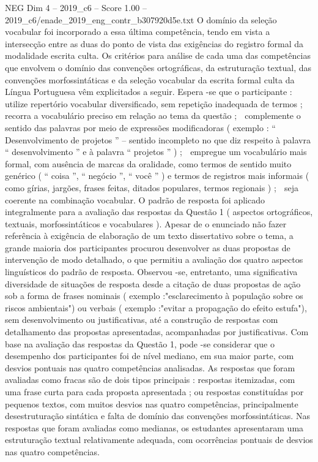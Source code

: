 \begin{textsample}{NEG Dim 4 – 2019\_c6 – Score 1.00 – 2019\_c6/enade\_2019\_eng\_contr\_b307920d5e.txt}
O domínio da seleção vocabular foi incorporado a essa última competência, tendo em vista a intersecção entre as duas do ponto de vista das exigências do registro formal da modalidade escrita culta.
Os critérios para análise de cada uma das competências que envolvem o domínio das convenções ortográficas, da estruturação textual, das convenções morfossintáticas e da seleção vocabular da escrita formal culta da Língua Portuguesa vêm explicitados a seguir.
Espera -se que o participante :  utilize repertório vocabular diversificado, sem repetição inadequada de termos ;  recorra a vocabulário preciso em relação ao tema da questão ;  complemente o sentido das palavras por meio de expressões modificadoras ( exemplo : “ Desenvolvimento de projetos ” – sentido incompleto no que diz respeito à palavra “ desenvolvimento ” e à palavra “ projetos ” ) ;  empregue um vocabulário mais formal, com ausência de marcas da oralidade, como termos de sentido muito genérico ( “ coisa ”, “ negócio ”, “ você ” ) e termos de registros mais informais ( como gírias, jargões, frases feitas, ditados populares, termos regionais ) ;  seja coerente na combinação vocabular.
O padrão de resposta foi aplicado integralmente para a avaliação das respostas da Questão 1 ( aspectos ortográficos, textuais, morfossintáticos e vocabulares ).
Apesar de o enunciado não fazer referência à exigência de elaboração de um texto dissertativo sobre o tema, a grande maioria dos participantes procurou desenvolver as duas propostas de intervenção de modo detalhado, o que permitiu a avaliação dos quatro aspectos linguísticos do padrão de resposta.
Observou -se, entretanto, uma significativa diversidade de situações de resposta desde a citação de duas propostas de ação sob a forma de frases nominais ( exemplo :"esclarecimento à população sobre os riscos ambientais") ou verbais ( exemplo :"evitar a propagação do efeito estufa"), sem desenvolvimento ou justificativas, até a construção de respostas com detalhamento das propostas apresentadas, acompanhadas por justificativas.
Com base na avaliação das respostas da Questão 1, pode -se considerar que o desempenho dos participantes foi de nível mediano, em sua maior parte, com desvios pontuais nas quatro competências analisadas.
As respostas que foram avaliadas como fracas são de dois tipos principais : respostas itemizadas, com uma frase curta para cada proposta apresentada ; ou respostas constituídas por pequenos textos, com muitos desvios nas quatro competências, principalmente desestruturação sintática e falta de domínio das convenções morfossintáticas.
Nas respostas que foram avaliadas como medianas, os estudantes apresentaram uma estruturação textual relativamente adequada, com ocorrências pontuais de desvios nas quatro competências.

\end{textsample}
